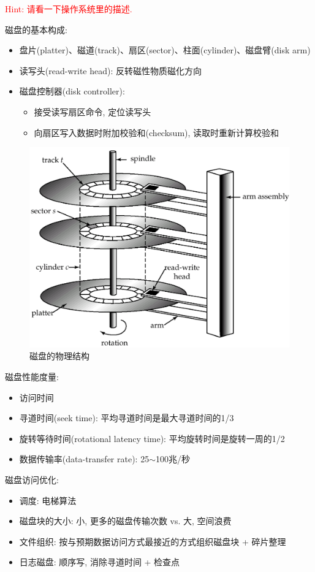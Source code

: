 \textcolor{red}{Hint: 请看一下操作系统里的描述.}

磁盘的基本构成:
\begin{itemize}
    \item 盘片(platter)、磁道(track)、扇区(sector)、柱面(cylinder)、磁盘臂(disk arm)
    \item 读写头(read-write head): 反转磁性物质磁化方向
    \item 磁盘控制器(disk controller):
    \begin{itemize}
        \item 接受读写扇区命令, 定位读写头
        \item 向扇区写入数据时附加校验和(checksum), 读取时重新计算校验和
    \end{itemize}
\end{itemize}

\begin{figure}[H]
    \centering
    \includegraphics[width=.5\textwidth]{figure/磁盘.png}
    \caption{磁盘的物理结构}
\end{figure}

磁盘性能度量:
\begin{itemize}
    \item 访问时间
    \item 寻道时间(seek time): 平均寻道时间是最大寻道时间的1/3
    \item 旋转等待时间(rotational latency time): 平均旋转时间是旋转一周的1/2
    \item 数据传输率(data-transfer rate): 25$\sim$100兆/秒
\end{itemize}

磁盘访问优化:
\begin{itemize}
    \item 调度: 电梯算法
    \item 磁盘块的大小: 小, 更多的磁盘传输次数 vs. 大, 空间浪费
    \item 文件组织: 按与预期数据访问方式最接近的方式组织磁盘块 + 碎片整理
    \item 日志磁盘: 顺序写, 消除寻道时间 + 检查点
\end{itemize}

